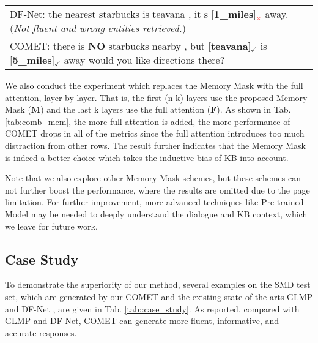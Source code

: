 \documentclass[11pt]{article}
\begin{document}
\begin{table*}[htbp]
{\begin{tabular}{l}
DF-Net: the nearest starbucks is teavana , it s {[}\textbf{1\_miles}{]}\textcolor{red}{$_\times$} away. (\textit{Not fluent and wrong entities retrieved.}) \tabularnewline
COMET: there is \textbf{NO} starbucks nearby , but {[}\textbf{teavana}{]}$_\checkmark$ is {[}\textbf{5\_miles}{]}$_\checkmark$ away would you like directions there?\tabularnewline
\hline
\end{tabular}{\scriptsize{}}}
\caption{Responses generated by our COMET, GLMP \cite{wu2018globaltolocal} and DF-Net \cite{qin-etal-2020-dynamic} from the SMD dataset. Goal means the row that the user is queried.
$\checkmark$ and \textcolor{red}{$\times$} mean the right or wrong entity linked.}
\label{tab::case_study}
\end{table*}


We also conduct the experiment which replaces the Memory Mask with the full attention, layer by layer. That is, the first (n-k) layers use the proposed Memory Mask (\textbf{M}) and the last k layers use the full attention (\textbf{F}).
As shown in Tab. \ref{tab:comb_mem}, the more full attention is added, the more performance of COMET drops in all of the metrics since the full attention introduces too much distraction from other rows. 
The result further indicates that the Memory Mask is indeed a better choice which takes the inductive bias of KB into account.







Note that we also explore other Memory Mask schemes, but these schemes can not further boost the performance, where the results are omitted due to the page limitation. For further improvement, more advanced techniques like Pre-trained Model \cite{devlin2018bert,radford2019language} may be needed to deeply understand the dialogue and KB context, which we leave for future work.


\subsection{Case Study}
To demonstrate the superiority of our method, several examples on the SMD test set, which are generated by our COMET and the existing state of the arts GLMP \cite{wu2018globaltolocal} and DF-Net \cite{qin-etal-2020-dynamic}, are given in Tab. \ref{tab::case_study}. 
As reported, compared with GLMP and DF-Net, COMET can generate more fluent, informative, and accurate responses. 
\end{document}
